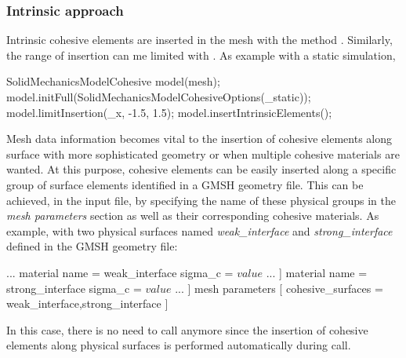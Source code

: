 \subsubsection{Intrinsic approach \label{intrinsic_insertion}}
Intrinsic cohesive elements are inserted in the mesh with the method 
. Similarly, the range of insertion can me limited 
with . As example with a static simulation,
\begin{cpp}
  SolidMechanicsModelCohesive model(mesh);
  model.initFull(SolidMechanicsModelCohesiveOptions(_static));
  model.limitInsertion(_x, -1.5, 1.5);
  model.insertIntrinsicElements();
\end{cpp} 
Mesh data information becomes vital to the insertion of cohesive elements along 
surface with more sophisticated geometry or when multiple cohesive materials are 
wanted. At this purpose, cohesive elements can be easily inserted along a 
specific group of surface elements identified in a GMSH geometry file. This can 
be achieved, in the input file, by specifying the name of these physical groups 
in the \textit{mesh parameters} section as well as their corresponding cohesive 
materials. As example, with two physical surfaces named 
\textit{weak\_interface} and \textit{strong\_interface} defined in the GMSH 
geometry file:
\begin{cpp}
...
  material %
     name = weak_interface
     sigma_c = $value$
     ...
  ]
  material %
     name = strong_interface
     sigma_c = $value$
     ...
  ]
  mesh parameters [
     	cohesive_surfaces = weak_interface,strong_interface
  ]
\end{cpp}

In this case, there is no need to call  anymore 
since the insertion of cohesive elements along physical surfaces is performed 
automatically during  call.    
